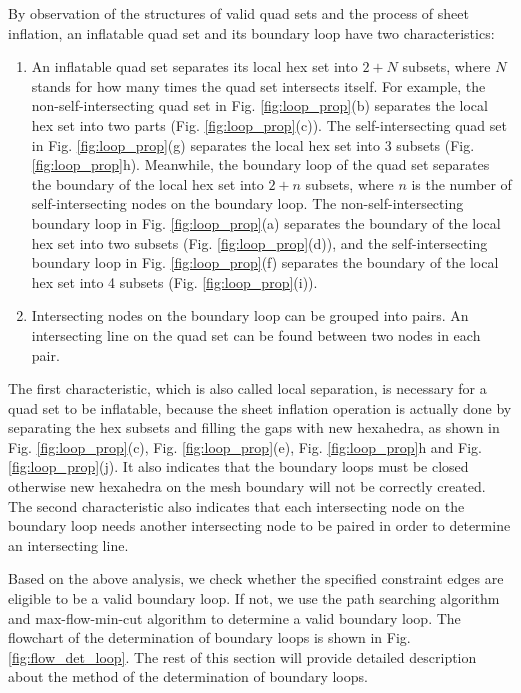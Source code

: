 \documentclass[final,5p,times,twocolumn]{elsarticle}
\begin{document}
By observation of the structures of valid quad sets and the process of sheet inflation, an inflatable quad set and its boundary loop have two characteristics:

\begin{enumerate}
\item An inflatable quad set separates its local hex set into $2+N$ subsets, where $N$ stands for how many times the quad set intersects itself. For example, the non-self-intersecting quad set in Fig. \ref{fig:loop_prop}(b) separates the local hex set into two parts (Fig. \ref{fig:loop_prop}(c)). The self-intersecting quad set in Fig. \ref{fig:loop_prop}(g) separates the local hex set into 3 subsets (Fig. \ref{fig:loop_prop}h). Meanwhile, the boundary loop of the quad set separates the boundary of the local hex set into $2+n$ subsets, where $n$ is the number of self-intersecting nodes on the boundary loop. The non-self-intersecting boundary loop in Fig. \ref{fig:loop_prop}(a) separates the boundary of the local hex set into two subsets (Fig. \ref{fig:loop_prop}(d)), and the self-intersecting boundary loop in Fig. \ref{fig:loop_prop}(f) separates the boundary of the local hex set into 4 subsets (Fig. \ref{fig:loop_prop}(i)).

\item Intersecting nodes on the boundary loop can be grouped into pairs. An intersecting line on the quad set can be found between two nodes in each pair.
\end{enumerate}

The first characteristic, which is also called local separation, is necessary for a quad set to be inflatable, because the sheet inflation operation is actually done by separating the hex subsets and filling the gaps with new hexahedra, as shown in Fig. \ref{fig:loop_prop}(c), Fig. \ref{fig:loop_prop}(e), Fig. \ref{fig:loop_prop}h and Fig. \ref{fig:loop_prop}(j). It also indicates that the boundary loops must be closed otherwise new hexahedra on the mesh boundary will not be correctly created. The second characteristic also indicates that each intersecting node on the boundary loop needs another intersecting node to be paired in order to determine an intersecting line.

Based on the above analysis, we check whether the specified constraint edges are eligible to be a valid boundary loop. If not, we use the path searching algorithm and max-flow-min-cut algorithm to determine a valid boundary loop. The flowchart of the determination of boundary loops is shown in Fig. \ref{fig:flow_det_loop}. The rest of this section will provide detailed description about the method of the determination of boundary loops.
\end{document}
